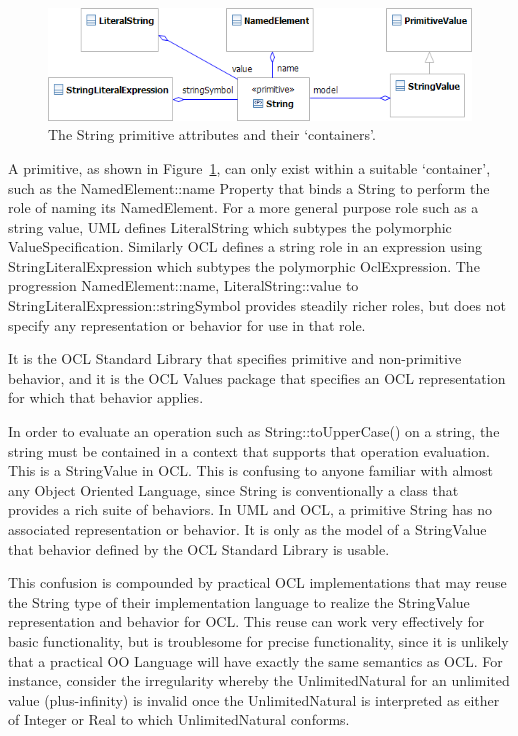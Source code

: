 \documentclass{eceasst}
\begin{document}
\begin{figure}
  \begin{center}
    \includegraphics[width=5.75in]{String.png}
  \end{center}
  \caption{The String primitive attributes and their `containers'.}
  \label{fig:String}
\end{figure}

A primitive, as shown in Figure~\ref{fig:String}, can only exist within a suitable `container', such as the NamedElement::name Property that binds a String to perform the role of naming its NamedElement.  For a more general purpose role such as a string value, UML defines LiteralString which subtypes the polymorphic ValueSpecification. Similarly OCL defines a string role in an expression using StringLiteralExpression which subtypes the polymorphic OclExpression. The progression NamedElement::name, LiteralString::value to StringLiteralExpression::stringSymbol provides steadily richer roles, but does not specify any representation or behavior for use in that role.

 It is the OCL Standard Library that specifies primitive and non-primitive behavior, and it is the OCL Values package that specifies an OCL representation for which that behavior applies. 

In order to evaluate an operation such as String::toUpperCase() on a string, the string must be contained in a context that supports that operation evaluation. This is a StringValue in OCL. This is confusing to anyone familiar with almost any Object Oriented Language, since String is conventionally a class that provides a rich suite of behaviors. In UML and OCL, a primitive String has no associated representation or behavior. It  is only as the model of a StringValue that behavior defined by the OCL Standard Library is usable.

This confusion is compounded by practical OCL implementations that may reuse the String type of their implementation language to realize the StringValue representation and behavior for OCL. This reuse can work very effectively for basic functionality, but is troublesome for precise functionality, since it is unlikely that a practical OO Language will have exactly the same semantics as OCL. For instance, consider the irregularity whereby the UnlimitedNatural for an unlimited value (plus-infinity)  is invalid once the UnlimitedNatural is interpreted as either of Integer or Real to which UnlimitedNatural conforms.
\end{document}
